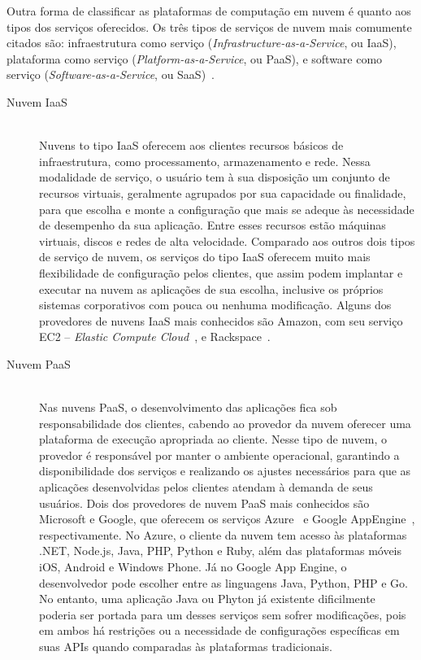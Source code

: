 Outra forma de classificar as plataformas de computação em nuvem é quanto aos tipos 
dos serviços oferecidos. Os três tipos de serviços de nuvem mais comumente citados 
são: infraestrutura como serviço (\emph{Infrastructure-as-a-Service}, ou IaaS), plataforma como serviço (\emph{Platform-as-a-Service}, ou PaaS), e 
software como serviço (\emph{Software-as-a-Service}, ou SaaS)~\cite{armbrust2010view,Zhang2010}. 

\begin{description}
\item[Nuvem IaaS] \hfill \\ Nuvens to tipo IaaS oferecem 
aos clientes recursos básicos de infraestrutura, como processamento, armazenamento 
e rede. Nessa modalidade de serviço, o usuário tem à sua disposição um conjunto
de recursos virtuais, geralmente agrupados por sua capacidade ou finalidade, para
que escolha e monte a configuração que mais se adeque às necessidade de desempenho
da sua aplicação. Entre esses recursos estão máquinas virtuais, discos e redes de alta velocidade. Comparado 
aos outros dois tipos de serviço de nuvem, os serviços do tipo IaaS oferecem muito 
mais flexibilidade de configuração pelos clientes, que assim podem implantar e 
executar na nuvem as aplicações de sua escolha, inclusive os próprios sistemas 
corporativos com pouca ou nenhuma modificação. Alguns dos provedores de nuvens 
IaaS mais conhecidos são Amazon, com seu serviço EC2 -- \emph{Elastic Compute 
Cloud}~\cite{ec2}, e Rackspace~\cite{rackspace}.


\item[Nuvem PaaS] \hfill \\ Nas nuvens PaaS, o desenvolvimento 
das aplicações fica sob responsabilidade dos clientes, cabendo ao provedor da 
nuvem oferecer uma plataforma de execução apropriada ao cliente. Nesse tipo de 
nuvem, o provedor é responsável por manter o ambiente operacional, garantindo a 
disponibilidade dos serviços e realizando os ajustes necessários para que as 
aplicações desenvolvidas pelos clientes atendam à demanda de seus usuários. 
Dois dos provedores de nuvem PaaS mais conhecidos são Microsoft e Google, que 
oferecem os serviços Azure~\cite{azure} e Google AppEngine~\cite{appengine}, 
respectivamente. No Azure, o cliente da nuvem tem acesso às plataformas 
.NET, Node.js, Java, PHP, Python e Ruby, além das plataformas móveis iOS, Android
e Windows Phone. Já no Google App Engine, o desenvolvedor pode escolher entre 
as linguagens Java, Python, PHP e Go. No entanto, uma aplicação Java ou Phyton 
já existente dificilmente poderia ser portada para um desses serviços sem sofrer 
modificações, pois em ambos há restrições ou a necessidade de configurações específicas
em suas APIs quando comparadas às plataformas tradicionais.


\end{description}
